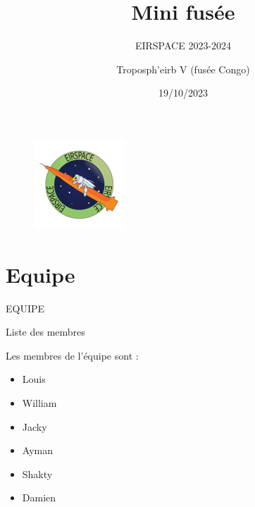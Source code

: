 \documentclass{beamer}
\author{Troposph'eirb V (fusée Congo)}
\title{Mini fusée}
\subtitle{EIRSPACE 2023-2024}
\institute{ENSEIRB-MATMECA}
\date{19/10/2023}
\begin{document}
\begin{frame}
	
	\titlepage

	\begin{figure}

		\begin{center}

			\includegraphics[width=0.2\linewidth]{pics/eirspace.png}
		\end{center}
	\end{figure}

\end{frame}



\begin{frame}

	\tableofcontents[sectionstyle=show,subsectionstyle=show/shaded/hide,subsubsectionstyle=show/shaded/hide]
\end{frame}



\section{Equipe}

	\begin{frame}

		\begin{center}

			\Huge EQUIPE
		\end{center}
	\end{frame}


	\begin{frame}{Liste des membres}

		Les membres de l'équipe sont : 
		
		
		\begin{itemize}

			\item Louis
			\item William
			\item Jacky
			\item Ayman
			\item Shakty
			\item Damien
		\end{itemize}
	\end{frame}
\end{document}
